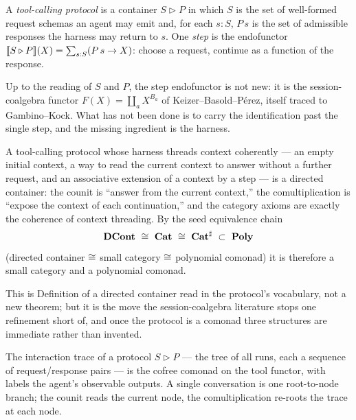 \begin{definition}\label{def:orch-protocol}
A \emph{tool-calling protocol} is a container $S\triangleright P$ in which $S$ is the set of
well-formed request schemas an agent may emit and, for each $s:S$, $P\,s$ is the set of admissible
responses the harness may return to $s$. One \emph{step} is the endofunctor
$\llbracket S\triangleright P \rrbracket(X)=\sum_{s:S}(P\,s\to X)$: choose a request, continue as a function of the
response.
\end{definition}

Up to the reading of $S$ and $P$, the step endofunctor is not new: it is the session-coalgebra
functor $F(X)=\coprod_{a}X^{B_a}$ of Keizer--Basold--P\'erez, itself traced to Gambino--Kock.
What has not been done is to carry the identification past the single step, and the missing ingredient
is the harness.

\begin{proposition}
\label{prop:orch-harness-comonad}
A tool-calling protocol whose harness threads context coherently --- an empty initial context, a way
to read the current context to answer without a further request, and an associative extension of a
context by a step --- is a directed container: the counit is ``answer from the current context,''
the comultiplication is ``expose the context of each continuation,'' and the category axioms are
exactly the coherence of context threading. By the seed equivalence chain
\begin{equation}\label{eq:orch-chain}
  \mathbf{DCont}\ \cong\ \mathbf{Cat}\ \cong\ \mathbf{Cat}^{\sharp}\ \subset\ \mathbf{Poly}
\end{equation}
\textup{(directed container $\cong$ small category $\cong$ polynomial comonad)}
\cite{AU16,ACU14,SS23} it is therefore a small category and a polynomial comonad.
\end{proposition}

This is Definition of a directed container read in the protocol's vocabulary, not a new theorem; but
it is the move the session-coalgebra literature stops one refinement short of, and once the protocol
is a comonad three structures are immediate rather than invented.

\begin{corollary}\label{cor:orch-trace}
The interaction trace of a protocol $S\triangleright P$ --- the tree of all runs, each a sequence of
request/response pairs --- is the cofree comonad on the tool functor, with labels the agent's
observable outputs. A single conversation is one root-to-node branch; the counit reads the current
node, the comultiplication re-roots the trace at each node.
\end{corollary}

